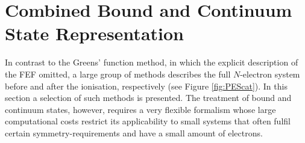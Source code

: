 %
\section{Combined Bound and Continuum State Representation}
\label{ch:r-mat}
In contrast to the Greens' function method, in which the explicit description of the FEF  omitted, a large group of methods describes the full $N$-electron system before and after the ionisation, respectively (see Figure \ref{fig:PEScat}).
In this section a selection of such methods is presented.
The treatment of bound and continuum states, however, requires a very flexible formalism whose large computational costs restrict its applicability to small systems that often fulfil certain symmetry-requirements and have a small amount of electrons.

